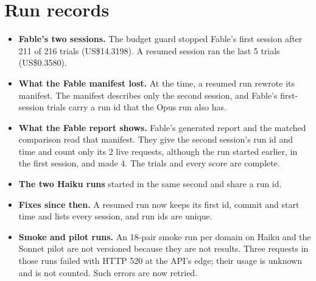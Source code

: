 \documentclass[11pt]{article}
\begin{document}
\section{Run records}
\label{app:records}
\begin{itemize}
  \item \textbf{Fable's two sessions.} The budget guard stopped Fable's first session after 211 of 216 trials (US\$14.3198). A resumed session ran the last 5 trials (US\$0.3580).
  \item \textbf{What the Fable manifest lost.} At the time, a resumed run rewrote its manifest. The manifest describes only the second session, and Fable's first-session trials carry a run id that the Opus run also has.
  \item \textbf{What the Fable report shows.} Fable's generated report and the matched comparison read that manifest. They give the second session's run id and time and count only its 2 live requests, although the run started earlier, in the first session, and made 4. The trials and every score are complete.
  \item \textbf{The two Haiku runs} started in the same second and share a run id.
  \item \textbf{Fixes since then.} A resumed run now keeps its first id, commit and start time and lists every session, and run ids are unique.
  \item \textbf{Smoke and pilot runs.} An 18-pair smoke run per domain on Haiku and the Sonnet pilot are not versioned because they are not results. Three requests in those runs failed with HTTP 520 at the API's edge; their usage is unknown and is not counted. Such errors are now retried.
\end{itemize}
\end{document}
